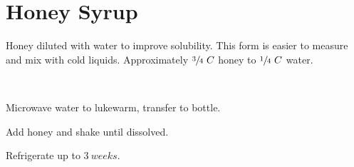 \section{Honey Syrup}


\begin{recipestats}[
	servings=$1~C$,
	preptime=5~\minute,
	source=Mike \& Jane,
	original=\citefield{cocktailSeminars2021}{title} \cite{cocktailSeminars2021},
]
\end{recipestats}


\begin{recipeabstract}
	Honey diluted with water to improve solubility.
	This form is easier to measure and mix with cold liquids.
	Approximately $\sfrac{3}{4}~C$ honey to $\sfrac{1}{4}~C$ water.
\end{recipeabstract}


\begin{ingredientcolumns}[1]
	\begin{ingredientblock}
		\\
	\end{ingredientblock}
\end{ingredientcolumns}


\begin{preparation}
\item Microwave water to lukewarm, transfer to bottle.
\item Add honey and shake until dissolved.
\item Refrigerate up to $3~weeks$.
\end{preparation}


\recipeend
